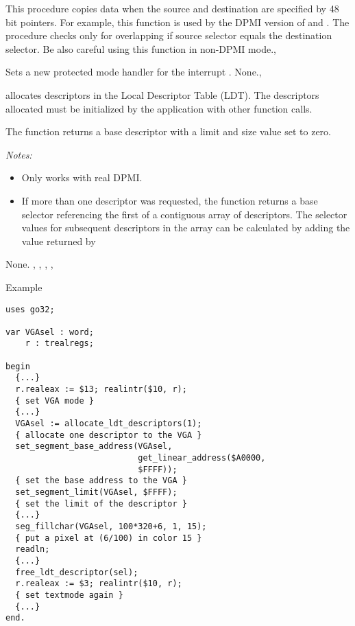 
{This procedure copies data when the source and destination are specified
by 48 bit pointers. For example, this function is used by the DPMI version
of  and . }{The procedure checks only
for overlapping if source selector equals the destination selector. 
Be also careful using this function in non-DPMI
mode.}{,}

{Sets a new protected mode handler for the interrupt .}
{None.}{, } 

{ allocates  descriptors in the 
Local Descriptor Table (LDT).
The descriptors allocated must be initialized by the application with
other function calls.

The function returns a base descriptor with a limit and size value set to 
zero.

{\em Notes:}
\begin{itemize}
\item Only works with real DPMI.
\item If more than one descriptor was requested, the function returns a base
selector referencing the first of a contiguous array of descriptors. The
selector values for subsequent descriptors in the array can be
calculated by adding the value returned by
\end{itemize}
}{None.}{
,
,
,
,
}
\begin{FPCList}
\item[Example]
\begin{verbatim}
uses go32;

var VGAsel : word;
    r : trealregs;

begin
  {...}
  r.realeax := $13; realintr($10, r); 
  { set VGA mode }
  {...}
  VGAsel := allocate_ldt_descriptors(1); 
  { allocate one descriptor to the VGA }
  set_segment_base_address(VGAsel, 
                           get_linear_address($A0000,
                           $FFFF)); 
  { set the base address to the VGA }
  set_segment_limit(VGAsel, $FFFF); 
  { set the limit of the descriptor }
  {...}
  seg_fillchar(VGAsel, 100*320+6, 1, 15); 
  { put a pixel at (6/100) in color 15 }
  readln;
  {...}
  free_ldt_descriptor(sel);
  r.realeax := $3; realintr($10, r); 
  { set textmode again }
  {...}
end.
\end{verbatim}
\end{FPCList}

